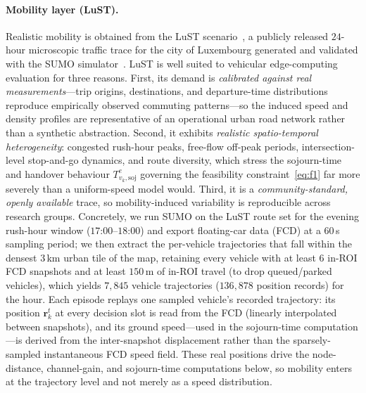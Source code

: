 \documentclass[11pt,a4paper]{article}
\theoremstyle{definition}
\begin{document}
\paragraph{Mobility layer (LuST).}
Realistic mobility is obtained from the LuST scenario~\cite{codeca2015lust}, a publicly released $24$-hour microscopic traffic trace for the city of Luxembourg generated and validated with the SUMO simulator~\cite{lopez2018sumo}. LuST is well suited to vehicular edge-computing evaluation for three reasons. First, its demand is \emph{calibrated against real measurements}---trip origins, destinations, and departure-time distributions reproduce empirically observed commuting patterns---so the induced speed and density profiles are representative of an operational urban road network rather than a synthetic abstraction. Second, it exhibits \emph{realistic spatio-temporal heterogeneity}: congested rush-hour peaks, free-flow off-peak periods, intersection-level stop-and-go dynamics, and route diversity, which stress the sojourn-time and handover behaviour $T^{e}_{v_k,\mathrm{soj}}$ governing the feasibility constraint~\eqref{eq:f1} far more severely than a uniform-speed model would. Third, it is a \emph{community-standard, openly available} trace, so mobility-induced variability is reproducible across research groups. Concretely, we run SUMO on the LuST route set for the evening rush-hour window ($17$:$00$--$18$:$00$) and export floating-car data (FCD) at a $60$\,s sampling period; we then extract the per-vehicle trajectories that fall within the densest $3$\,km urban tile of the map, retaining every vehicle with at least $6$ in-ROI FCD snapshots and at least $150$\,m of in-ROI travel (to drop queued/parked vehicles), which yields $7{,}845$ vehicle trajectories ($136{,}878$ position records) for the hour. Each episode replays one sampled vehicle's recorded trajectory: its position $\mathbf{r}_k^t$ at every decision slot is read from the FCD (linearly interpolated between snapshots), and its ground speed---used in the sojourn-time computation---is derived from the inter-snapshot displacement rather than the sparsely-sampled instantaneous FCD speed field. These real positions drive the node-distance, channel-gain, and sojourn-time computations below, so mobility enters at the trajectory level and not merely as a speed distribution.
\end{document}
